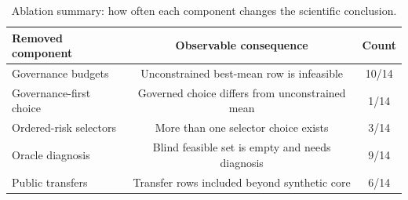 \begin{table}[t]
\centering
\small
\caption{Ablation summary: how often each component changes the scientific conclusion.}
\label{tab:ablation_summary}
\begin{tabular}{lcc}
\toprule
Removed component & Observable consequence & Count \\
\midrule
Governance budgets & Unconstrained best-mean row is infeasible & 10/14 \\
Governance-first choice & Governed choice differs from unconstrained mean & 1/14 \\
Ordered-risk selectors & More than one selector choice exists & 3/14 \\
Oracle diagnosis & Blind feasible set is empty and needs diagnosis & 9/14 \\
Public transfers & Transfer rows included beyond synthetic core & 6/14 \\
\bottomrule
\end{tabular}
\end{table}

